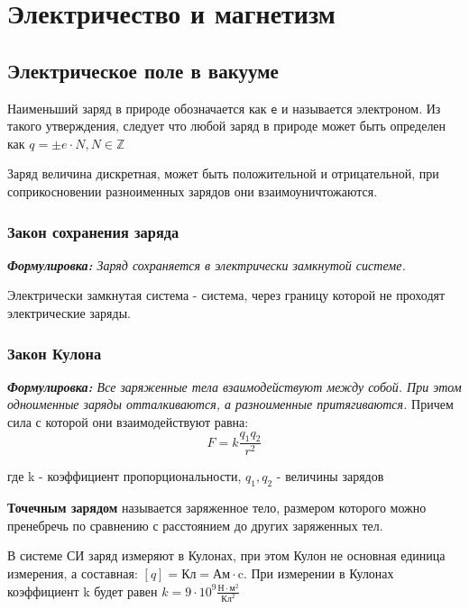 \documentclass[../main.tex]{subfiles}
\begin{document}
\chapter{Электричество и магнетизм}

\section{Электрическое поле в вакууме}
Наименьший заряд в природе обозначается как \texttt{e} и называется электроном. Из такого утверждения, следует что любой заряд в природе может быть определен как  $ q = \pm e \cdot N, N \in \mathbb{Z}$

\vspace{5px}

Заряд величина дискретная, может быть положительной и отрицательной, при соприкосновении разноименных зарядов они взаимоуничтожаются.
\subsection{Закон сохранения заряда}
\textit{\textbf{Формулировка:} Заряд сохраняется в электрически замкнутой системе.}

 Электрически замкнутая система - система, через границу которой не проходят электрические заряды.

\subsection{Закон Кулона}
\textit{\textbf{Формулировка:} Все заряженные тела взаимодействуют между собой. При этом одноименные заряды отталкиваются, а разноименные притягиваются.}
Причем сила с которой они взаимодействуют равна:
\[ F = k\frac{q_1 q_2}{r^2}\]
\begin{center}
    где k - коэффициент пропорциональности,  $q_1,q_2$ - величины зарядов
\end{center}

 \textbf{Точечным зарядом} называется заряженное тело, размером которого можно пренебречь по сравнению с расстоянием до других заряженных тел.

\vspace{5px}

В системе СИ заряд измеряют в Кулонах, при этом Кулон не основная единица измерения, а составная: $[q] = \text{Кл} = \text{Ам} \cdot \text{c}$.
При измерении в Кулонах коэффициент k будет равен $k = 9 \cdot 10^9 \frac{\text{Н} \cdot \text{м}^2}{\text{Кл}^2}$
\end{document}
